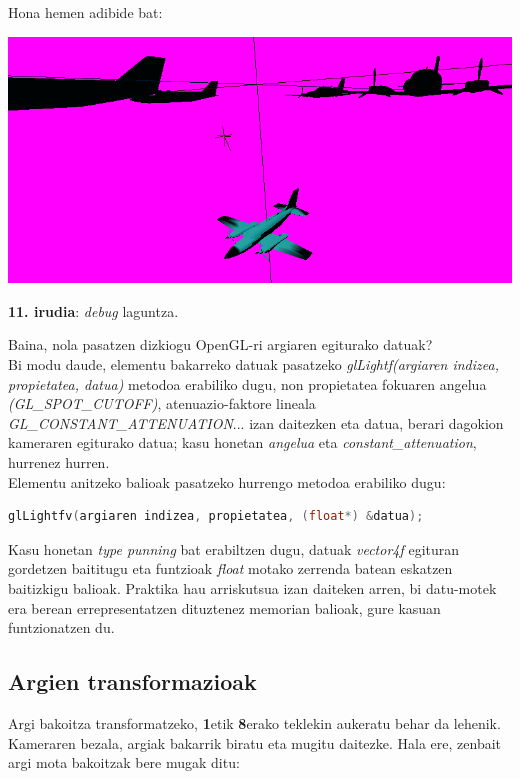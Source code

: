 \documentclass[12pt]{article}
\newcommand{\metodo}[1] {\textit{#1}}
\newcommand{\aldagai}[1] {\textit{#1}}
\newcommand{\tekla}[1] {\textbf{#1}}
\begin{document}
Hona hemen adibide bat:\\
\begin{center}
\includegraphics[scale=1.3]{debug.png}

\textbf{11. irudia}: \textit{debug} laguntza.
\end{center}

Baina, nola pasatzen dizkiogu OpenGL-ri argiaren egiturako datuak?\\
Bi modu daude, elementu bakarreko datuak pasatzeko \metodo{glLightf(argiaren indizea, propietatea, datua)} metodoa erabiliko dugu, non 
propietatea fokuaren angelua \textit{(GL\_SPOT\_CUTOFF)}, atenuazio-faktore lineala \textit{GL\_CONSTANT\_ATTENUATION}... izan daitezken eta datua, berari dagokion kameraren egiturako datua; kasu honetan \aldagai{angelua} eta \aldagai{constant\_attenuation}, hurrenez hurren.\\

Elementu anitzeko balioak pasatzeko hurrengo metodoa erabiliko dugu:
\begin{lstlisting}[language=C]
glLightfv(argiaren indizea, propietatea, (float*) &datua);
\end{lstlisting}
Kasu honetan \textit{type punning}\cite{punning} bat erabiltzen dugu, datuak \aldagai{vector4f} egituran gordetzen baititugu eta funtzioak \aldagai{float} motako zerrenda batean eskatzen baitizkigu balioak. Praktika hau arriskutsua izan daiteken arren, bi datu-motek era berean errepresentatzen dituztenez memorian balioak, gure kasuan funtzionatzen du.

\subsection{Argien transformazioak}

Argi bakoitza transformatzeko, \tekla{1}etik \tekla{8}erako teklekin aukeratu behar da lehenik. Kameraren bezala, argiak bakarrik biratu eta mugitu daitezke. Hala ere, zenbait argi mota bakoitzak bere mugak ditu:
\end{document}
